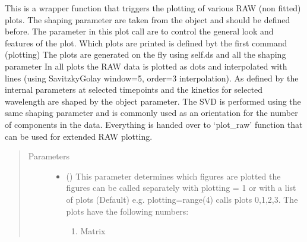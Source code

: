 \documentclass[letterpaper,10pt,english]{sphinxmanual}
\begin{document}
\begin{fulllineitems}
\begin{fulllineitems}
\label{\detokenize{plot_func:plot_func.TA.Plot_RAW}}
This is a wrapper function that triggers the plotting of various RAW (non fitted) plots.
The shaping parameter are taken from the object and should be defined before.
The parameter in this plot call are to control the general look and features of the plot.
Which plots are printed is defined byt the first command (plotting)
The plots are generated on the fly using self.ds and all the shaping parameter
In all plots the RAW data is plotted as dots and interpolated with lines
(using Savitzky\sphinxhyphen{}Golay window=5, order=3 interpolation). As defined by the internal parameters
at selected time\sphinxhyphen{}points and the kinetics for selected wavelength are shaped by the
object parameter. The SVD is performed using the same shaping parameter and is commonly
used as an orientation for the number of components in the data.
Everything is handed over to ‘plot\_raw’ function that can be used for extended RAW plotting.
\begin{quote}\begin{description}
\item[{Parameters}] \leavevmode\begin{itemize}
\item {} 
 (\sphinxstyleliteralemphasis{\sphinxupquote{ (}}\sphinxstyleliteralemphasis{\sphinxupquote{)}}\sphinxstyleliteralemphasis{\sphinxupquote{, }}) \textendash{} 
This parameter determines which figures are plotted
the figures can be called separately with plotting = 1
or with a list of plots (Default) e.g. plotting=range(4) calls plots 0,1,2,3.
The plots have the following numbers:
\begin{enumerate}
%
\setcounter{enumi}{-1}
\item {} 
Matrix


\end{enumerate}
\end{itemize}
\end{description}
\end{quote}
\end{fulllineitems}
\end{fulllineitems}
\end{document}
